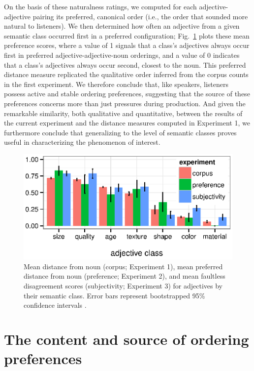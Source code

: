 \documentclass{pnastwo}
\begin{document}
\begin{article}
On the basis of these naturalness ratings, we computed for each adjective-adjective pairing its preferred, canonical order (i.e., the order that sounded more natural to listeners). We then determined how often an adjective from a given semantic class occurred first in a preferred  configuration; Fig.\ \ref{results} plots these mean preference scores, where a value of 1 signals that a class's adjectives always occur first in preferred adjective-adjective-noun orderings, and a value of 0 indicates that a class's adjectives always occur second, closest to the noun. This preferred distance measure replicated the qualitative order inferred from the corpus counts in the first experiment. We therefore conclude that, like speakers, listeners possess active and stable ordering preferences, suggesting that the source of these preferences concerns more than just pressures during production. And given the remarkable similarity, both qualitative and quantitative, between the results of the current experiment and the distance measures computed in Experiment 1, we furthermore conclude that generalizing to the level of semantic classes proves useful in characterizing the phenomenon of interest.

\begin{figure}[h]
	\centering
	\includegraphics[width=\linewidth]{plots/expt_results.eps}
	\vspace{-10pt}
\caption{Mean distance from noun (corpus; Experiment 1), mean preferred distance from noun  (preference; Experiment 2), and mean faultless disagreement scores (subjectivity; Experiment 3) for adjectives by their semantic class. Error bars represent bootstrapped 95\% confidence intervals \cite{diciccioefron1996}.}\label{results}
\end{figure}

\section{The content and source of ordering preferences}


\end{article}
\end{document}
